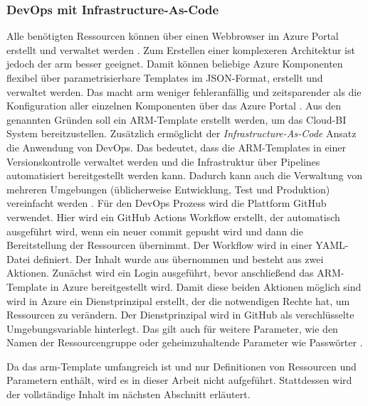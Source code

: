 \subsubsection{DevOps mit Infrastructure-As-Code} \label{subsec:infra:konfig:policy}
Alle benötigten Ressourcen können über einen Webbrowser im Azure Portal erstellt und verwaltet werden \cite{chilberto_building_2020}. Zum Erstellen einer komplexeren Architektur ist jedoch der \ac{arm} besser geeignet. Damit können beliebige Azure Komponenten flexibel über parametrisierbare Templates im JSON-Format, erstellt und verwaltet werden. Das macht \ac{arm} weniger fehleranfällig und zeitsparender als die Konfiguration aller einzelnen Komponenten über das Azure Portal \cite{monadjemi_azure-administration_2017}. Aus den genannten Gründen soll ein ARM-Template erstellt werden, um das Cloud-BI System bereitzustellen. Zusätzlich ermöglicht der \textit{Infrastructure-As-Code} Ansatz die Anwendung von DevOps. Das bedeutet, dass die ARM-Templates in einer Versionskontrolle verwaltet werden und die Infrastruktur über Pipelines automatisiert bereitgestellt werden kann. Dadurch kann auch die Verwaltung von mehreren Umgebungen (üblicherweise Entwicklung, Test und Produktion) vereinfacht werden \cite{riscutia_data_2021}. Für den DevOps Prozess wird die Plattform GitHub verwendet. Hier wird ein GitHub Actions Workflow erstellt, der automatisch ausgeführt wird, wenn ein neuer commit gepusht wird und dann die Bereitstellung der Ressourcen übernimmt. Der Workflow wird in einer YAML-Datei definiert. Der Inhalt wurde aus  übernommen und besteht aus zwei Aktionen. Zunächst wird ein Login ausgeführt, bevor anschließend das ARM-Template in Azure bereitgestellt wird. Damit diese beiden Aktionen möglich sind wird in Azure ein Dienstprinzipal erstellt, der die notwendigen Rechte hat, um Ressourcen zu verändern. Der Dienstprinzipal wird in GitHub als verschlüsselte Umgebungsvariable hinterlegt. Das gilt auch für weitere Parameter, wie den Namen der Ressourcengruppe oder geheimzuhaltende Parameter wie Passwörter \cite[vgl.][]{rendon_deploy_2022}.

Da das \ac{arm}-Template umfangreich ist und nur Definitionen von Ressourcen und Parametern enthält, wird es in dieser Arbeit nicht aufgeführt. Stattdessen wird der vollständige Inhalt im nächsten Abschnitt erläutert.